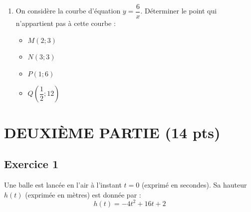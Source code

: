 \documentclass[a4paper,12pt]{article}
\begin{document}
\begin{enumerate}
\item On considère la courbe d'équation $y = \dfrac{6}{x}$. Déterminer le point qui n'appartient pas à cette courbe :
\begin{itemize}
\item[A.] $M(2;3)$
\item[B.] $N(3;3)$
\item[C.] $P(1;6)$
\item[D.] $Q\left(\dfrac{1}{2};12\right)$
\end{itemize}

\end{enumerate}

\newpage

\section*{DEUXIÈME PARTIE (14 pts)}

\subsection*{Exercice 1}

Une balle est lancée en l'air à l'instant $t = 0$ (exprimé en secondes). Sa hauteur $h(t)$ (exprimée en mètres) est donnée par :
\[
h(t) = -4t^2 + 16t + 2
\]
\end{document}
